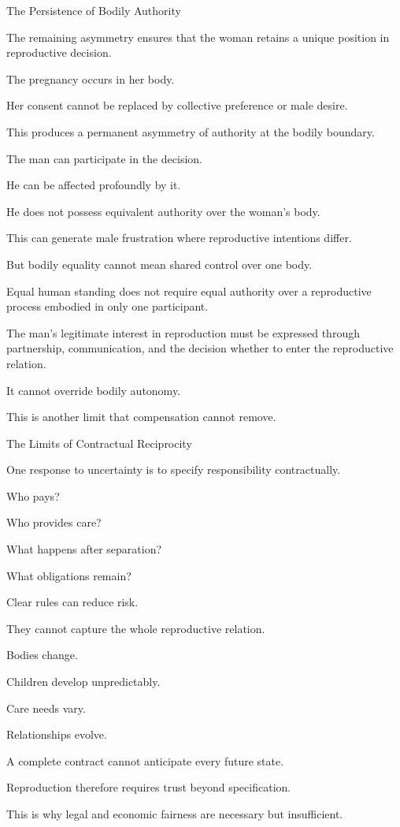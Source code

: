 The Persistence of Bodily Authority

The remaining asymmetry ensures that the woman retains a unique position in reproductive decision.

The pregnancy occurs in her body.

Her consent cannot be replaced by collective preference or male desire.

This produces a permanent asymmetry of authority at the bodily boundary.

The man can participate in the decision.

He can be affected profoundly by it.

He does not possess equivalent authority over the woman’s body.

This can generate male frustration where reproductive intentions differ.

But bodily equality cannot mean shared control over one body.

Equal human standing does not require equal authority over a reproductive process embodied in only one participant.

The man’s legitimate interest in reproduction must be expressed through partnership, communication, and the decision whether to enter the reproductive relation.

It cannot override bodily autonomy.

This is another limit that compensation cannot remove.

The Limits of Contractual Reciprocity

One response to uncertainty is to specify responsibility contractually.

Who pays?

Who provides care?

What happens after separation?

What obligations remain?

Clear rules can reduce risk.

They cannot capture the whole reproductive relation.

Bodies change.

Children develop unpredictably.

Care needs vary.

Relationships evolve.

A complete contract cannot anticipate every future state.

Reproduction therefore requires trust beyond specification.

This is why legal and economic fairness are necessary but insufficient.

